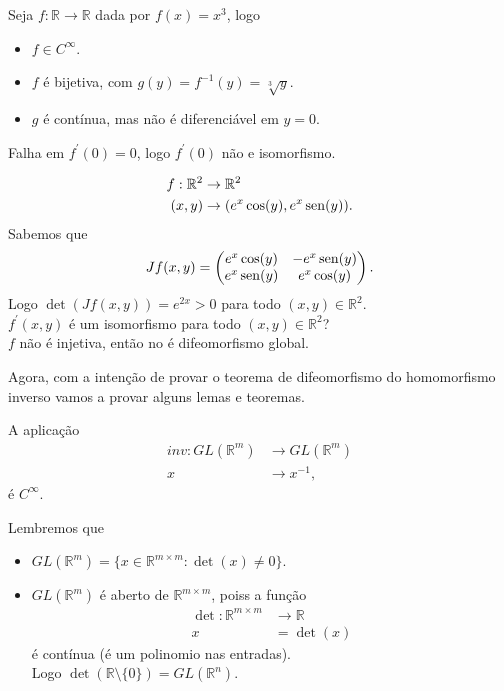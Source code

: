 \begin{example}
  Seja $f:\mathbb{R}\to\mathbb{R}$ dada por $f(x)=x^3$, logo
  \begin{itemize}
    \item $f\in C^{\infty}$.
    \item $f$ é bijetiva, com $g(y)=f^{-1}(y)=\sqrt[3]{y}$.
    \item $g$ é contínua, mas não é diferenciável em $y=0$. 
  \end{itemize}
  Falha em $f^{\prime}(0)=0$, logo $f^{\prime}(0)$ não e isomorfismo. 
\end{example}
\begin{example}
  \begin{align*}
    f:\mathbb{R}^{2}&\to\mathbb{R}^{2}\\
    (x,y)&\to(e^{x}\cos(y),e^{x}\operatorname{sen}(y)).
  \end{align*}
  Sabemos que
  \begin{align*}
    Jf(x,y)=\begin{pmatrix}
      e^{x}\cos(y) & -e^{x}\operatorname{sen}(y) \\
      e^{x}\operatorname{sen}(y) & e^{x}\cos(y)
    \end{pmatrix}.
  \end{align*}
  Logo $\det(Jf(x,y))=e^{2x}>0$ para todo $(x,y)\in\mathbb{R}^{2}$.\\
  $f^{\prime}(x,y)$ é um isomorfismo para todo $(x,y)\in\mathbb{R}^{2}$?\\
  $f$ não é injetiva, então no é difeomorfismo global. 
\end{example}
Agora, com a intenção de provar o teorema de difeomorfismo do homomorfismo inverso vamos a provar alguns lemas e teoremas.
\begin{lemma}\label{lema:inversa-e-cinfinito}
  A aplicação
  \begin{align*}
    inv:GL(\mathbb{R}^{m})&\to GL(\mathbb{R}^{m})\\
    x&\to x^{-1},
  \end{align*}
  é $C^{\infty}$.
\end{lemma}
Lembremos que
\begin{itemize}
  \item $GL(\mathbb{R}^{m})=\{x\in \mathbb{R}^{m\times m}:\det(x)\neq 0\}$.
  \item $GL(\mathbb{R}^{m})$ é aberto de $\mathbb{R}^{m\times m}$, poiss a função
    \begin{align*}
      \det:\mathbb{R}^{m\times m}&\to\mathbb{R}\\
      x&=\det(x)
    \end{align*}
    é contínua (é um polinomio nas entradas).\\
    Logo $\det(\mathbb{R}\setminus\{0\})=GL(\mathbb{R}^{n})$.
\end{itemize}
